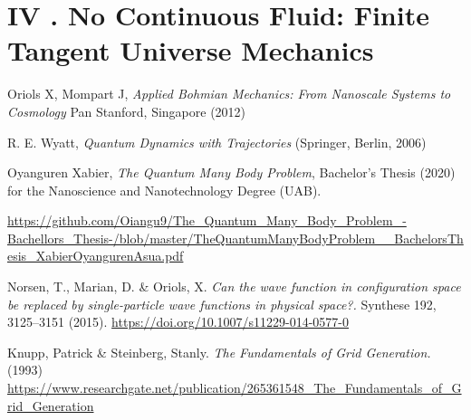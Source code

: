 \documentclass[11pt, a4paper]{article} %
\begin{document}
\newpage
\section*{IV . No Continuous Fluid: Finite Tangent Universe Mechanics}




 


\begin{thebibliography}{1}

	Oriols X, Mompart J, {\em Applied Bohmian Mechanics: From Nanoscale Systems to Cosmology} Pan Stanford, Singapore (2012)
	

R. E. Wyatt, {\em Quantum Dynamics with Trajectories} (Springer, Berlin, 2006)


	Oyanguren Xabier, {\em The Quantum Many Body Problem}, Bachelor's Thesis (2020) for the Nanoscience and Nanotechnology Degree (UAB).

\href{https://github.com/Oiangu9/The\_Quantum\_Many\_Body\_Problem\_-Bachellors\_Thesis-/blob/master/TheQuantumManyBodyProblem\_\_BachelorsThesis\_XabierOyangurenAsua.pdf}{https://github.com/Oiangu9/The\_Quantum\_Many\_Body\_Problem\_-Bachellors\_Thesis-/blob/master/TheQuantumManyBodyProblem\_\_BachelorsThesis\_XabierOyangurenAsua.pdf}

Norsen, T., Marian, D. \& Oriols, X. {\em Can the wave function in configuration space be replaced by single-particle wave functions in physical space?.} Synthese 192, 3125–3151 (2015). \href{https://doi.org/10.1007/s11229-014-0577-0}{https://doi.org/10.1007/s11229-014-0577-0}


Knupp, Patrick \& Steinberg, Stanly. {\em The Fundamentals of Grid Generation.} (1993) \href{https://www.researchgate.net/publication/265361548_The_Fundamentals_of_Grid_Generation}{https://www.researchgate.net/publication/265361548\_The\_Fundamentals\_of\_Grid\_Generation} 


	
\end{thebibliography}
\end{document}
